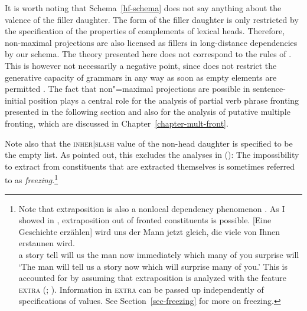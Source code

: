It is worth noting that Schema~\ref{hf-schema} does not say anything about the valence of the filler
daughter. The form of the filler daughter is only restricted by the specification of the properties of complements of lexical 
heads. Therefore, non-maximal projections are also licensed as fillers in long-distance dependencies by our schema. The theory
presented here does not correspond to the rules of \xbart \citep*{Jackendoff77a}. This is however not necessarily a negative
point, since \xbart does not restrict the generative capacity of grammars in any way as soon as
empty elements are permitted \citep{Pullum85a,KP90a}. The fact that non"=maximal projections are possible in sentence-initial position plays a central role
for the analysis of partial verb phrase fronting presented in the following section and also for the analysis of putative
multiple fronting, which are discussed in Chapter~\ref{chapter-mult-front}. 

Note also that the \textsc{inher$|$slash} value of the non-head daughter is specified to be the
empty list. As \citet[]{Mueller99a} pointed out, this excludes the analyses in ():
\eal
{}
\zl
The impossibility to extract from constituents that are extracted themselves is sometimes referred to
as \emph{freezing}.\footnote{%
  Note that extraposition is also a nonlocal dependency phenomenon \citep{Mueller2004d}. As I showed
  in , extraposition out of fronted constituents is possible. 
\ea
\gll {}[Eine Geschichte erzählen] wird uns der Mann jetzt gleich, die viele von Ihnen erstaunen wird.\\
     \spacebr{}a story tell       will us  the man  now   immediately which many of you surprise
     will\\
\glt `The man will tell us a story now which will surprise many of you.' \citep[]{Mueller99a}
\z
This is accounted for
  by assuming that extraposition is analyzed with the feature \textsc{extra} (\citealp{Keller94,Keller95b}; \citealp[Section~13.2]{Mueller99a}). Information in
  \textsc{extra} can be passed up independently of specifications of \slasch values. See
  Section~\ref{sec-freezing} for more on freezing.
}

